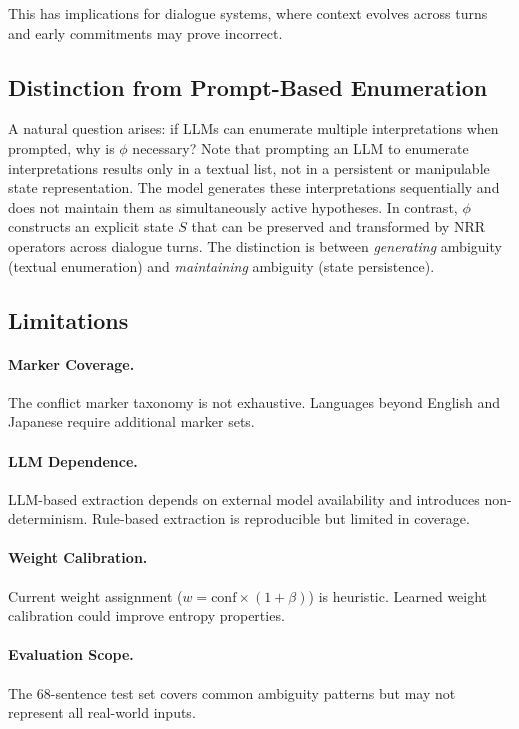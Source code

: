 \documentclass[11pt,a4paper]{article}
\begin{document}
This has implications for dialogue systems, where context evolves across turns 
and early commitments may prove incorrect.

\subsection{Distinction from Prompt-Based Enumeration}

A natural question arises: if LLMs can enumerate multiple interpretations when 
prompted, why is $\phi$ necessary? Note that prompting an LLM to enumerate 
interpretations results only in a textual list, not in a persistent or manipulable 
state representation. The model generates these interpretations sequentially and 
does not maintain them as simultaneously active hypotheses. In contrast, $\phi$ 
constructs an explicit state $S$ that can be preserved and transformed by NRR 
operators across dialogue turns. The distinction is between \textit{generating} 
ambiguity (textual enumeration) and \textit{maintaining} ambiguity (state persistence).

\subsection{Limitations}

\paragraph{Marker Coverage.}
The conflict marker taxonomy is not exhaustive. Languages beyond English and 
Japanese require additional marker sets.

\paragraph{LLM Dependence.}
LLM-based extraction depends on external model availability and introduces 
non-determinism. Rule-based extraction is reproducible but limited in coverage.

\paragraph{Weight Calibration.}
Current weight assignment ($w = \text{conf} \times (1 + \beta)$) is heuristic. 
Learned weight calibration could improve entropy properties.

\paragraph{Evaluation Scope.}
The 68-sentence test set covers common ambiguity patterns but may not represent 
all real-world inputs.
\end{document}
